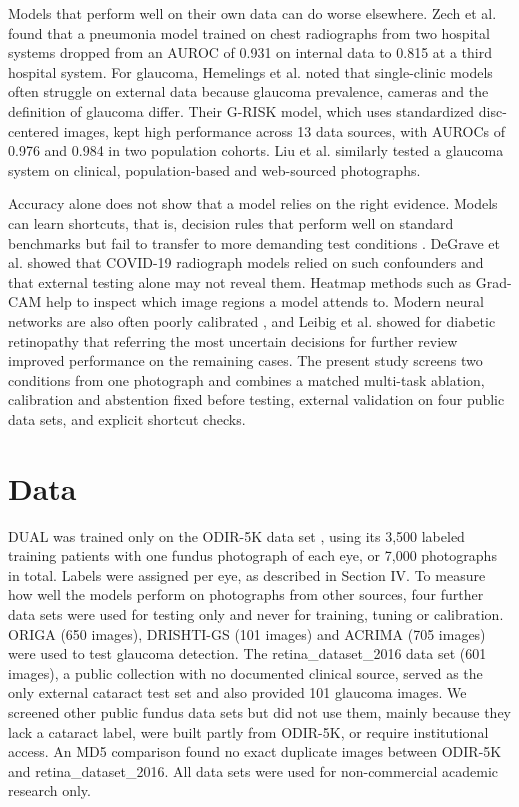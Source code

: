\documentclass[conference,a4paper]{IEEEtran}
\begin{document}
Models that perform well on their own data can do worse elsewhere. Zech et al. \cite{ref17} found
that a pneumonia model trained on chest radiographs from two hospital systems dropped from an AUROC
of 0.931 on internal data to 0.815 at a third hospital system. For glaucoma, Hemelings et al.
\cite{ref9} noted that single-clinic models often struggle on external data because glaucoma
prevalence, cameras and the definition of glaucoma differ. Their G-RISK model, which uses
standardized disc-centered images, kept high performance across 13 data sources, with AUROCs of 0.976
and 0.984 in two population cohorts. Liu et al. \cite{ref7} similarly tested a glaucoma system on
clinical, population-based and web-sourced photographs.

Accuracy alone does not show that a model relies on the right evidence. Models can learn shortcuts,
that is, decision rules that perform well on standard benchmarks but fail to transfer to more
demanding test conditions \cite{ref18}. DeGrave et al. \cite{ref19} showed that COVID-19 radiograph
models relied on such confounders and that external testing alone may not reveal them. Heatmap
methods such as Grad-CAM \cite{ref10} help to inspect which image regions a model attends to. Modern
neural networks are also often poorly calibrated \cite{ref20}, and Leibig et al. \cite{ref21} showed
for diabetic retinopathy that referring the most uncertain decisions for further review improved
performance on the remaining cases. The present study screens two conditions from one photograph and
combines a matched multi-task ablation, calibration and abstention fixed before testing, external
validation on four public data sets, and explicit shortcut checks.

\section{Data}

DUAL was trained only on the ODIR-5K data set \cite{ref16}, using its 3,500 labeled training
patients with one fundus photograph of each eye, or 7,000 photographs in total. Labels were assigned
per eye, as described in Section IV. To measure how well the models perform on photographs from
other sources, four further data sets were used for testing only and never for training, tuning or
calibration. ORIGA \cite{ref22} (650 images), DRISHTI-GS \cite{ref23} (101 images) and ACRIMA
\cite{ref12} (705 images) were used to test glaucoma detection. The retina\_dataset\_2016 data set
\cite{ref24} (601 images), a public collection with no documented clinical source, served as the
only external cataract test set and also provided 101 glaucoma images. We screened other public
fundus data sets but did not use them, mainly because they lack a cataract label, were built partly
from ODIR-5K, or require institutional access. An MD5 comparison found no exact duplicate images
between ODIR-5K and retina\_dataset\_2016. All data sets were used for non-commercial academic
research only.
\end{document}
